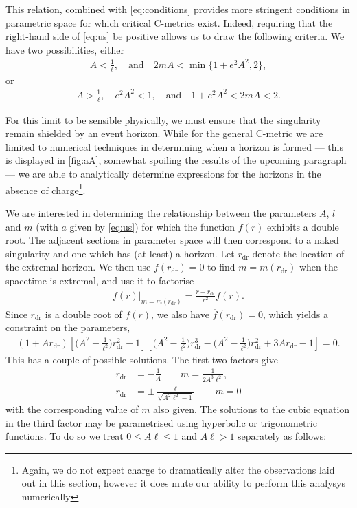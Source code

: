 \documentclass[
twoside,openright,frontopenright]{dmathesis}
\newcommand{\nn}{\nonumber}
\newcommand{\dr}{\mathrm{dr}}
\begin{document}
This relation, combined with \cref{eq:conditions} provides more stringent
conditions in parametric space for which critical C-metrics exist. Indeed,
requiring that the right-hand side of \cref{eq:us} be positive allows us to draw
the following criteria. We have two possibilities, either
\begin{align}\label{eq:case1}
A<\frac{1}{\ell},\quad \mbox{and}\quad 2mA<\min \{1+e^2A^2,2\},
\end{align}
or
\begin{align}\label{eq:case2}
A>\frac{1}{\ell}, \quad e^2A^2<1, \quad \mbox{and} \quad 1+e^2A^2<2mA<2.
\end{align}


For this limit to be sensible physically, we must ensure that the singularity
remain shielded by an event horizon. While for the general C-metric we are
limited to numerical techniques in determining when a horizon is formed --- this
is displayed in \cref{fig:aA}, somewhat spoiling the results of the upcoming
paragraph --- we are able to analytically determine expressions for the horizons
in the absence of charge\footnote{Again, we do not expect charge to dramatically
  alter the observations laid out in this section, however it does mute our
  ability to perform this analysys numerically}.

We are interested in determining the relationship between the parameters $A$,
$l$ and $m$ (with $a$ given by \cref{eq:us}) for which the function $f(r)$
exhibits a double root. The adjacent sections in parameter space will then
correspond to a naked singularity and one which has (at least) a horizon. Let
$r_\dr$ denote the location of the extremal horizon. We then use $f(r_\dr)=0$ to
find $m=m(r_\dr)$ when the spacetime is extremal, and use it to factorise
\begin{align}
f(r)\big|_{m=m(r_\dr)}=\frac{r-r_\dr}{r^2}\overline{f}(r).
\end{align}
Since $r_\dr$ is a double root of $f(r)$, we also have $\overline{f}(r_\dr)=0$,
which yields a constraint on the parameters,
\begin{align}
 (1+Ar_\dr)\left[\Big(A^{2}-\frac{1}{\ell^2}\Big)r_\dr^2-1\right]\left[\Big(A^2-\frac{1}{\ell^2}\Big)r_\dr^3-\Big(A^2-\frac{1}{\ell^2}\Big)r_\dr^2+3Ar_\dr-1\right]=0.
\end{align}
This has a couple of possible solutions. The first two factors give
\begin{align}
r_\dr &=- \frac{1}{A} \qquad m = \frac{1}{2A^3\ell^2},\nn\\
r_\dr &= \pm\frac{\ell}{\sqrt{A^2\ell^2-1}}\qquad m =0
\end{align}
with the corresponding value of $m$ also given. The solutions to the cubic
equation in the third factor may be parametrised using hyperbolic or
trigonometric functions. To do so we treat $0\leqslant A\ell\leqslant 1$ and
$A\ell>1$ separately as follows:
\end{document}
